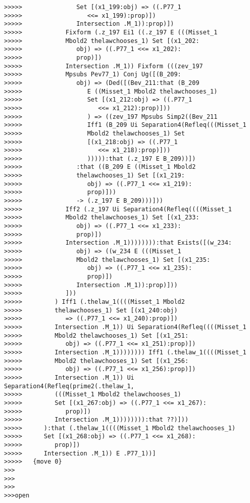 \documentclass[12pt]{article}
\begin{document}
\begin{verbatim}
>>>>>               Set [(x1_199:obj) => ((.P77_1
>>>>>                  <<= x1_199):prop)])
>>>>>               Intersection .M_1)):prop)])
>>>>>            Fixform (.z_197 Ei1 ((.z_197 E (((Misset_1
>>>>>            Mbold2 thelawchooses_1) Set [(x1_202:
>>>>>               obj) => ((.P77_1 <<= x1_202):
>>>>>               prop)])
>>>>>            Intersection .M_1)) Fixform (((zev_197
>>>>>            Mpsubs Pev77_1) Conj Ug([(B_209:
>>>>>               obj) => (Ded([(Bev_211:that (B_209
>>>>>                  E ((Misset_1 Mbold2 thelawchooses_1)
>>>>>                  Set [(x1_212:obj) => ((.P77_1
>>>>>                     <<= x1_212):prop)]))
>>>>>                  ) => ((zev_197 Mpsubs Simp2((Bev_211
>>>>>                  Iff1 (B_209 Ui Separation4(Refleq(((Misset_1
>>>>>                  Mbold2 thelawchooses_1) Set
>>>>>                  [(x1_218:obj) => ((.P77_1
>>>>>                     <<= x1_218):prop)]))
>>>>>                  ))))):that (.z_197 E B_209))])
>>>>>               :that ((B_209 E ((Misset_1 Mbold2
>>>>>               thelawchooses_1) Set [(x1_219:
>>>>>                  obj) => ((.P77_1 <<= x1_219):
>>>>>                  prop)]))
>>>>>               -> (.z_197 E B_209)))]))
>>>>>            Iff2 (.z_197 Ui Separation4(Refleq((((Misset_1
>>>>>            Mbold2 thelawchooses_1) Set [(x1_233:
>>>>>               obj) => ((.P77_1 <<= x1_233):
>>>>>               prop)])
>>>>>            Intersection .M_1)))))))):that Exists([(w_234:
>>>>>               obj) => ((w_234 E (((Misset_1
>>>>>               Mbold2 thelawchooses_1) Set [(x1_235:
>>>>>                  obj) => ((.P77_1 <<= x1_235):
>>>>>                  prop)])
>>>>>               Intersection .M_1)):prop)]))
>>>>>            ]))
>>>>>         ) Iff1 (.thelaw_1((((Misset_1 Mbold2
>>>>>         thelawchooses_1) Set [(x1_240:obj)
>>>>>            => ((.P77_1 <<= x1_240):prop)])
>>>>>         Intersection .M_1)) Ui Separation4(Refleq((((Misset_1
>>>>>         Mbold2 thelawchooses_1) Set [(x1_251:
>>>>>            obj) => ((.P77_1 <<= x1_251):prop)])
>>>>>         Intersection .M_1)))))))) Iff1 (.thelaw_1((((Misset_1
>>>>>         Mbold2 thelawchooses_1) Set [(x1_256:
>>>>>            obj) => ((.P77_1 <<= x1_256):prop)])
>>>>>         Intersection .M_1)) Ui Separation4(Refleq(prime2(.thelaw_1,
>>>>>         (((Misset_1 Mbold2 thelawchooses_1)
>>>>>         Set [(x1_267:obj) => ((.P77_1 <<= x1_267):
>>>>>            prop)])
>>>>>         Intersection .M_1)))))))):that ??)]))
>>>>>      ):that (.thelaw_1((((Misset_1 Mbold2 thelawchooses_1)
>>>>>      Set [(x1_268:obj) => ((.P77_1 <<= x1_268):
>>>>>         prop)])
>>>>>      Intersection .M_1)) E .P77_1))]
>>>>>   {move 0}
>>>
>>>
>>>
>>>open


\end{verbatim}
\end{document}
